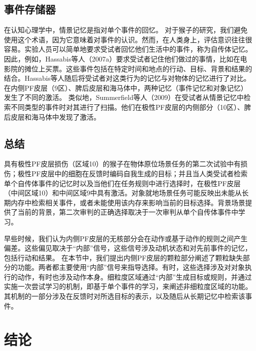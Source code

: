 \subsection{事件存储器}
在认知心理学中，情景记忆是指对单个事件的回忆。
对于猴子的研究，我们避免使用这个术语，因为它意味着对事件的认识。然而，在人类身上，评估意识往往很容易。实验人员可以简单地要求受试者回忆他们生活中的事件，称为自传体记忆。因此，例如，Hassabis等人（2007a）要求受试者记住他们做过的事情，比如在电影院的摊位上买票。这些事件包括在特定时间和地点的行动、目标、背景和结果的结合。Hassabis等人随后将受试者对这类行为的记忆与对物体的记忆进行了对比。在内侧PF皮层（9区）、脾后皮层和海马体中，两种记忆（事件记忆和对象记忆）发生了不同的激活。
类似地，Summerfield等人（2009）在受试者从情景记忆中检索不同类型的事件时对其进行了扫描。他们在极性PF皮层的内侧部分（10区）、脾后皮层和海马体中发现了激活。\par
\subsection{总结}
具有极性PF皮层损伤（区域10）的猴子在物体原位场景任务的第二次试验中有损伤；极性PF皮层中的细胞在反馈时编码自我生成的目标；并且当人类受试者检索单个自传体事件的记忆时以及当他们在任务规则中进行选择时，在极性PF皮层（中间区域10）和中间区域9中具有激活。对象就地场景任务可能反映出未能从长期内存中检索相关事件，或者未能使用该内存来影响当前的目标选择。背景场景提供了当前的背景，第二次审判的正确选择取决于一次审判从单个自传体事件中学习。\par
早些时候，我们认为内侧PF皮层的无核部分会在动作或基于动作的规则之间产生偏差。这些偏见取决于“内部”信号，这些信号涉及动机状态和对先前事件的记忆，包括行动和结果。
在本节中，我们提出内侧PF皮层的颗粒部分阐述了颗粒缺失部分的功能。两者都主要使用“内部”信号来指导选择。有时，这些选择涉及对对象执行的动作，有时也涉及动作本身。细粒度区域通过“内部”生成目标或规则，并通过实施一次尝试学习的机制，即基于单个事件的学习，来阐述非细粒度区域的功能。其机制的一部分涉及在反馈时对所选目标的表示，以及随后从长期记忆中检索该事件。\par
\section{结论}

